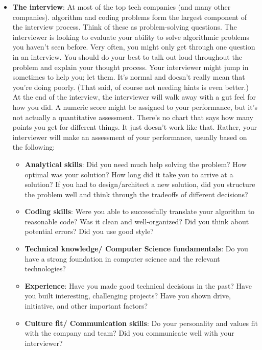 \documentclass{report}
\begin{document}
    \begin{itemize}
        \item \textbf{The interview}: At most of the top tech companies (and many other companies). algorithm and coding problems form the largest component of the interview process. Think of these as problem-solving questions. The interviewer is looking to evaluate your ability to solve algorithmic problems you haven't seen before.  
            \bigbreak \noindent 
            Very often, you might only get through one question in an interview. You should do your best to talk out loud throughout the problem and explain your thought process. Your interviewer might jump in sometimes to help you; let them. It's normal and doesn't really mean that you're doing poorly. (That said, of course not needing hints is even better.) 
            \bigbreak \noindent 
            At the end of the interview, the interviewer will walk away with a gut feel for how you did. A numeric score might be assigned to your performance, but it's not actually a quantitative assessment. There's no chart that says how many points you get for different things. It just doesn't work like that.
            \bigbreak \noindent 
            Rather, your interviewer will make an assessment of your performance, usually based on the following:
            \begin{itemize}
                \item \textbf{Analytical skills}: Did you need much help solving the problem? How optimal was your solution? How long did it take you to arrive at a solution? If you had to design/architect a new solution, did you structure the problem well and think through the tradeoffs of different decisions?
                \item \textbf{Coding skills}: Were you able to successfully translate your algorithm to reasonable code? Was it clean and well-organized? Did you think about potential errors? Did you use good style?
                \item \textbf{Technical knowledge/ Computer Science fundamentals}: Do you have a strong foundation in computer science and the relevant technologies?
                \item \textbf{Experience}: Have you made good technical decisions in the past? Have you built interesting, challenging projects? Have you shown drive, initiative, and other important factors?
                \item \textbf{Culture fit/ Communication skills}: Do your personality and values fit with the company and team? Did you communicate well with your interviewer? 

\end{itemize}
\end{itemize}
\end{document}
